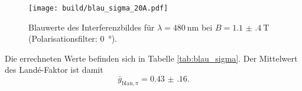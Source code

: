 \begin{figure}[htb]
  \centering
  \texttt{[image: build/blau\_sigma\_20A.pdf]}
  \caption{Blauwerte des Interferenzbildes für $\lambda=\SI{480}{\nano\meter}$ bei $B=\SI{1.1(4)}{\tesla}$ (Polarisationsfilter: \SI{0}{\degree}).}
  \label{fig:blau_sigma_20A_plot}
\end{figure}
Die errechneten Werte befinden sich in Tabelle \ref{tab:blau_sigma}.
Der Mittelwert des Landé-Faktor ist damit
\begin{equation}
\label{eqn:g_blau_pi}
\bar{g}_{\text{blau},\pi}=\num{0.43(16)}.
\end{equation}

\FloatBarrier